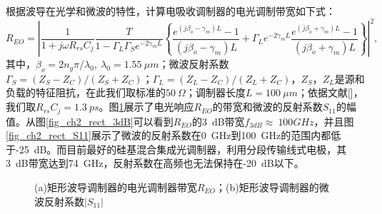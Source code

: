 根据波导在光学和微波的特性，计算电吸收调制器的电光调制带宽如下式\cite{li1999ultrahigh, tang2008design}：
\begin{equation}
\label{Equ:eoresponse}
R_{EO} = \left|\frac{1}{1+j\omega R_{rs} C_j}\frac{T}{1-\Gamma_L \Gamma_S  e^{-2 \gamma_m L} } \left\{\frac{e^{(j\beta_o-\gamma_m)L}-1}{(j\beta_o-\gamma_m)L}+\Gamma_L e^{-2\gamma_m L} \frac{e^{(j\beta_o+\gamma_m)L}-1}{(j\beta_o+\gamma_m)L} \right\} \right|^2,
\end{equation}
其中，$\beta_o = 2n_g\pi/\lambda_0,~\lambda_0 = 1.55~\mu m $；微波反射系数$\Gamma_S=(Z_S-Z_C)/(Z_S+Z_C)$；$\Gamma_L=(Z_L-Z_C)/(Z_L+Z_C)$，$Z_S$，$Z_L$是源和负载的特征阻抗，在此我们取标准的$50~ \Omega$；调制器长度$L = 100~ \mu m$；依据文献[]，我们取$R_{rs} C_j=1.3~ ps$。图\ref{fig_ch2_rect_3dB_S11}展示了电光响应$R_{EO}$的带宽和微波的反射系数$S_{11}$的幅值。从图\ref{fig_ch2_rect_3dB}可以看到$R_{EO}$的3~dB带宽$f_{3dB}\approx ~100 GHz$，并且图\ref{fig_ch2_rect_S11}展示了微波的反射系数在0~GHz到100~GHz的范围内都低于-25~dB。而目前最好的硅基混合集成光调制器，利用分段传输线式电极，其3~dB带宽达到74~GHz，反射系数在高频也无法保持在-20~dB以下\cite{tang2012over}。
\begin{figure}[htb]
	\small
\caption{(a)矩形波导调制器的电光调制器带宽$R_{EO}$；(b)矩形波导调制器的微波反射系数$|S_{11}|$}
\label{fig_ch2_rect_3dB_S11}	
\end{figure}
		
